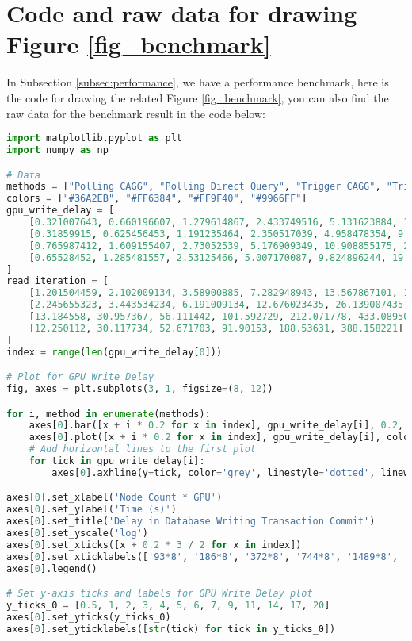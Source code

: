 \chapter{Code and raw data for drawing Figure \ref{fig_benchmark}}
In Subsection \ref{subsec:performance}, we have a performance benchmark, here is the code for drawing the related Figure \ref{fig_benchmark}, you can also find the raw data for the benchmark result in the code below:

\begin{lstlisting}[language=Python]
import matplotlib.pyplot as plt
import numpy as np

# Data
methods = ["Polling CAGG", "Polling Direct Query", "Trigger CAGG", "Trigger in Memory"]
colors = ["#36A2EB", "#FF6384", "#FF9F40", "#9966FF"]
gpu_write_delay = [
    [0.321007643, 0.660196607, 1.279614867, 2.433749516, 5.131623884, 11.624568741],
    [0.31859915, 0.625456453, 1.191235464, 2.350517039, 4.958478354, 9.977873813],
    [0.765987412, 1.609155407, 2.73052539, 5.176909349, 10.908855175, 20.96940738],
    [0.65528452, 1.285481557, 2.53125466, 5.007170087, 9.824896244, 19.604722893]
]
read_iteration = [
    [1.201504459, 2.102009134, 3.58900885, 7.282948943, 13.567867101, 18.581255946],
    [2.245655323, 3.443534234, 6.191009134, 12.676023435, 26.139007435, 55.204802484],
    [13.184558, 30.957367, 56.111442, 101.592729, 212.071778, 433.089509],
    [12.250112, 30.117734, 52.671703, 91.90153, 188.53631, 388.158221]
]
index = range(len(gpu_write_delay[0]))

# Plot for GPU Write Delay
fig, axes = plt.subplots(3, 1, figsize=(8, 12))

for i, method in enumerate(methods):
    axes[0].bar([x + i * 0.2 for x in index], gpu_write_delay[i], 0.2, label=method, color=colors[i])
    axes[0].plot([x + i * 0.2 for x in index], gpu_write_delay[i], color=colors[i], marker='o', linewidth=1, markersize=2)
    # Add horizontal lines to the first plot
    for tick in gpu_write_delay[i]:
        axes[0].axhline(y=tick, color='grey', linestyle='dotted', linewidth=0.3)

axes[0].set_xlabel('Node Count * GPU')
axes[0].set_ylabel('Time (s)')
axes[0].set_title('Delay in Database Writing Transaction Commit')
axes[0].set_yscale('log')
axes[0].set_xticks([x + 0.2 * 3 / 2 for x in index])
axes[0].set_xticklabels(['93*8', '186*8', '372*8', '744*8', '1489*8', '2978*8'])
axes[0].legend()

# Set y-axis ticks and labels for GPU Write Delay plot
y_ticks_0 = [0.5, 1, 2, 3, 4, 5, 6, 7, 9, 11, 14, 17, 20]
axes[0].set_yticks(y_ticks_0)
axes[0].set_yticklabels([str(tick) for tick in y_ticks_0])



\end{lstlisting}
